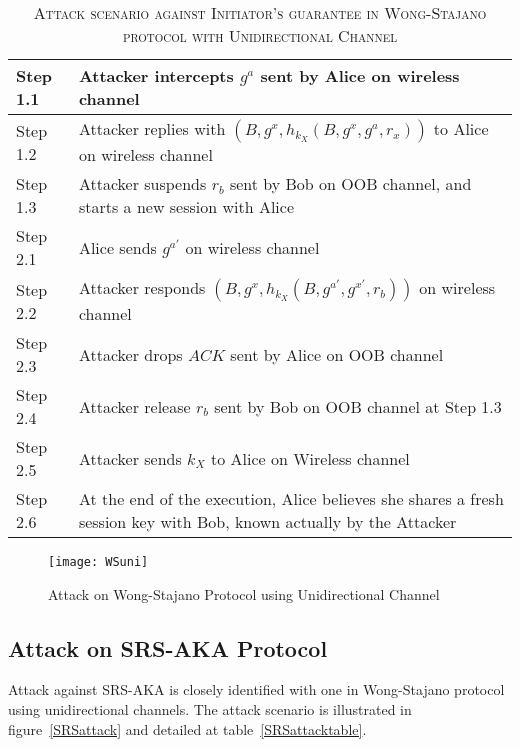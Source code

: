 \begin{table}[t]
\centering
\caption{\textsc{Attack scenario against Initiator's guarantee in Wong-Stajano protocol with Unidirectional Channel}}
\label{WSuniattack}
{\small
\begin{tabular}{| l | p{11cm} |}
 \hline
 Step 1.1 & Attacker intercepts $g^{a}$ sent by Alice on wireless channel\\ \hline
 Step 1.2 & Attacker replies with $(B, g^{x}, h_{k_X}(B,g^{x},g^a,r_x))$ to Alice on wireless channel\\ \hline
 Step 1.3 & Attacker suspends $r_b$ sent by Bob on OOB channel, and starts a new session with Alice\\ \hline \hline
 Step 2.1 & Alice sends $g^{a'}$ on wireless channel\\ \hline
 Step 2.2 & Attacker responds $(B, g^{x}, h_{k_X}(B,g^{a'},g^{x'},r_b))$ on wireless channel\\ \hline
 Step 2.3 & Attacker drops $ACK$ sent by Alice on OOB channel\\ \hline
 Step 2.4 & Attacker release $r_b$ sent by Bob on OOB channel at Step 1.3\\ \hline
 Step 2.5 & Attacker sends $k_X$ to Alice on Wireless channel\\ \hline
 Step 2.6 & At the end of the execution, Alice believes she shares a fresh session key with Bob, known actually by the Attacker\\ \hline
\end{tabular}
}
\end{table}

\begin{figure}
  \centering
  \texttt{[image: WSuni]}
  \caption{Attack on Wong-Stajano Protocol using Unidirectional Channel}
  \label{WSuniattack}
\end{figure}

\subsection{Attack on SRS-AKA Protocol}

Attack against SRS-AKA is closely identified with one in Wong-Stajano protocol using unidirectional channels. The attack scenario is illustrated in figure~\ref{SRSattack} and detailed at table~\ref{SRSattacktable}.

